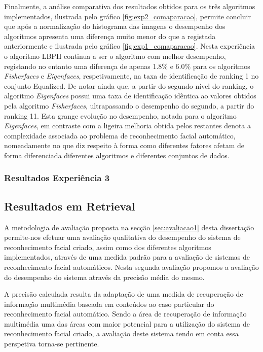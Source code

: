 Finalmente, a análise comparativa dos resultados obtidos para os três algoritmos implementados, ilustrada pelo gráfico \ref{fig:exp2_comaparacao}, permite concluir que após a normalização do histograma das imagens o desempenho dos algoritmos apresenta uma diferença muito menor do que a registada anteriormente e ilustrada pelo gráfico \ref{fig:exp1_comaparacao}. Nesta experiência o algoritmo LBPH continua a ser o algoritmo com melhor desempenho, registando no entanto uma diferença de apenas 1.8\% e 6.0\% para os algoritmos \textit{Fisherfaces} e \textit{Eigenfaces}, respetivamente, na taxa de identificação de ranking 1 no conjunto Equalized. De notar ainda que, a partir do segundo nível do ranking, o algoritmo  \textit{Eigenfaces} possui uma taxa de identificação idêntica ao valores obtidos pela algoritmo \textit{Fisherfaces}, ultrapassando o desempenho do segundo, a partir do ranking 11. Esta grange evolução no desempenho, notada para o algoritmo \textit{Eigenfaces}, em contraste com a ligeira melhoria obtida pelos restantes denota a complexidade associada ao problema de reconhecimento facial automático, nomeadamente no que diz respeito à forma como diferentes fatores afetam de forma diferenciada diferentes algoritmos e diferentes conjuntos de dados.

\subsubsection{Resultados Experiência 3}


\subsection{Resultados em Retrieval} \label{sec:avaliacao2}
A metodologia de avaliação proposta na secção \ref{sec:avaliacao1} desta dissertação permite-nos efetuar uma avaliação qualitativa do desempenho do sistema de reconhecimento facial criado, assim como dos diferentes algoritmos implementados, através de uma medida padrão para a avaliação de sistemas de reconhecimento facial automáticos. Nesta segunda avaliação propomos a avaliação do desempenho do sistema através da precisão média do mesmo. 

A precisão calculada resulta da adaptação de uma medida de recuperação de informação multimédia baseada em conteúdos ao caso particular do reconhecimento facial automático. Sendo a área de recuperação de informação multimédia uma das áreas com maior potencial para a utilização do sistema de reconhecimento facial criado, a avaliação deste sistema tendo em conta essa perspetiva torna-se pertinente.

